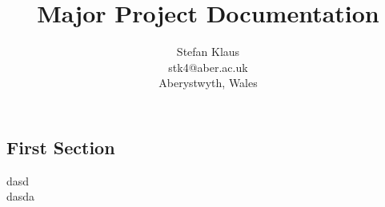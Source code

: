 \documentclass[10pt,a4paper]{article}
\author{Stefan Klaus\\stk4@aber.ac.uk\\Aberystwyth, Wales}
\title{Major Project Documentation}
\begin{document}

\maketitle
\newpage
\tableofcontents
\newpage
\begin{flushleft}
\section{First Section}
dasd \cite{slam} \\
dasda \cite{coverage}

\newpage


\end{flushleft}
\end{document}
